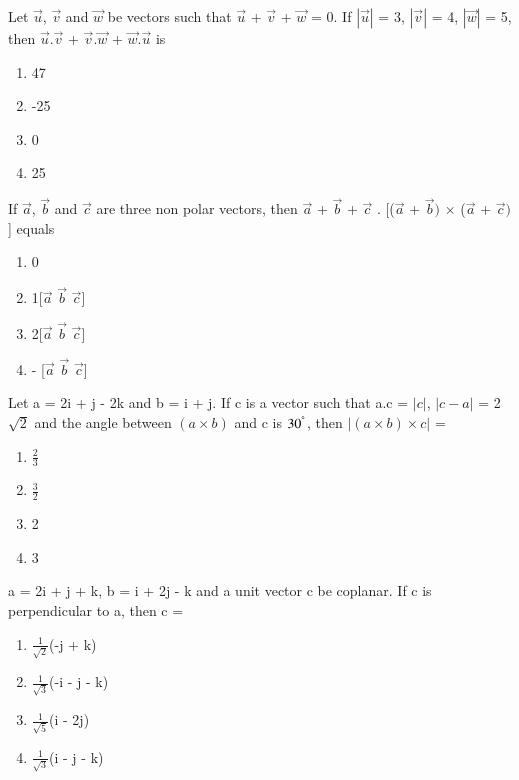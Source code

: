 \item Let $\overrightarrow{u}$, $\overrightarrow{v}$ and $\overrightarrow{w}$ be vectors such that $\overrightarrow{u}$ + $\overrightarrow{v}$ + $\overrightarrow{w}$ = 0. If $|\overrightarrow{u}|$ = 3, $|\overrightarrow{v}|$ = 4, $|\overrightarrow{w}|$ = 5, then $\overrightarrow{u}.\overrightarrow{v}$  + $\overrightarrow{v}.\overrightarrow{w}$ + $\overrightarrow{w}.\overrightarrow{u}$ is
\begin{enumerate}
\item 47
\item -25
\item 0
\item 25
\end{enumerate}

\item If $\overrightarrow{a}$, $\overrightarrow{b}$ and $\overrightarrow{c}$ are three non polar vectors, then $\overrightarrow{a}$ + $\overrightarrow{b}$ + $\overrightarrow{c}$ . [($\overrightarrow{a}$ + $\overrightarrow{b})$ $\times$ ($\overrightarrow{a}$ + $\overrightarrow{c})$] equals
\begin{enumerate}
\item 0
\item 1[$\overrightarrow{a}$  $\overrightarrow{b}$  $\overrightarrow{c}$]
\item 2[$\overrightarrow{a}$  $\overrightarrow{b}$  $\overrightarrow{c}$]
\item - [$\overrightarrow{a}$  $\overrightarrow{b}$  $\overrightarrow{c}$]
\end{enumerate}

\item Let a = 2i + j - 2k and b = i + j. If c is a vector such that a.c = $|c|$, $|c - a|$ = 2$\sqrt{2}$ and the angle between $(a \times b)$ and c is $30^{\degree}$, then $| (a \times b) \times c| $ = 
\begin{enumerate}
\item $\frac{2}{3}$
\item $\frac{3}{2}$
\item 2
\item 3
\end{enumerate}

\item a = 2i + j + k, b = i + 2j - k and a unit vector c be coplanar. If c is perpendicular to a, then c = 
\begin{enumerate}
\item $\frac{1}{\sqrt{2}}$(-j + k)
\item $\frac{1}{\sqrt{3}}$(-i - j - k)
\item $\frac{1}{\sqrt{5}}$(i - 2j)
\item $\frac{1}{\sqrt{3}}$(i - j - k)
\end{enumerate}

